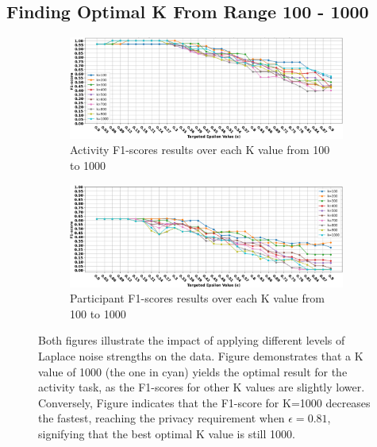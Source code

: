 \documentclass{l4proj}
\begin{document}
\begin{appendices}
\newpage

\subsection{Finding Optimal K From Range 100 - 1000}
\begin{figure}[h]
    \centering
    \begin{subfigure}{1\textwidth}
        \includegraphics[width=\textwidth]{images/privacy-preservation-topk1000-evaluation-method2-activity-f1-scores.png}
        \caption{Activity F1-scores results over each K value from 100 to 1000}
        \label{fig:privacy-preservation-topk1000-evaluation-method2-activity-f1-scores}
    \end{subfigure}
    \qquad
    \begin{subfigure}{1\textwidth}
        \includegraphics[width=\textwidth]{images/privacy-preservation-topk1000-evaluation-method2-participant-f1-scores.png}
        \caption{Participant F1-scores results over each K value from 100 to 1000}
        \label{fig:privacy-preservation-topk1000-evaluation-method2-participant-f1-scores}
    \end{subfigure}
    \caption{Both figures illustrate the impact of applying different levels of Laplace noise strengths on the data. Figure  demonstrates that a K value of 1000 (the one in cyan) yields the optimal result for the activity task, as the F1-scores for other K values are slightly lower. Conversely, Figure  indicates that the F1-score for K=1000 decreases the fastest, reaching the privacy requirement when $\epsilon=0.81$, signifying that the best optimal K value is still 1000.}
    \label{fig:privacy-preservation-topk1000-evaluation}
\end{figure}


\end{appendices}
\end{document}
